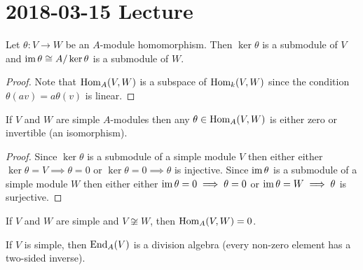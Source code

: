 \section{2018-03-15 Lecture}

\begin{prop}
	Let $\theta: V \to W$ be an $A$-module homomorphism.
	Then $\ker\theta$ is a submodule of $V$ and $\operatorname{im}\theta \cong A/\ker\theta$ is a submodule of $W$.
\end{prop}

\begin{proof}
	Note that $\operatorname{Hom}_A(V,W)$ is a subspace of $\operatorname{Hom}_k(V,W)$ since the condition $\theta(av)=a\theta(v)$ is linear.
\end{proof}

\begin{thm}
	If $V$ and $W$ are simple $A$-modules then any $\theta \in \operatorname{Hom}_A(V,W)$ is either zero or invertible (an isomorphism).
\end{thm}

\begin{proof}
	Since $\ker\theta$ is a submodule of a simple module $V$ then either either $\ker\theta = V \implies \theta=0$ or $\ker\theta=0 \implies \theta$ is injective.
	Since $\operatorname{im}\theta$ is a submodule of a simple module $W$ then either either $\operatorname{im}\theta = 0 \implies \theta=0$ or $\operatorname{im}\theta=W \implies \theta$ is surjective.
\end{proof}

\begin{cor}
	If $V$ and $W$ are simple and $V \not\cong W$, then $\operatorname{Hom}_A(V,W)=0$.
\end{cor}

\begin{cor}
	If $V$ is simple, then $\operatorname{End}_A(V)$ is a division algebra (every non-zero element has a two-sided inverse).
\end{cor}

